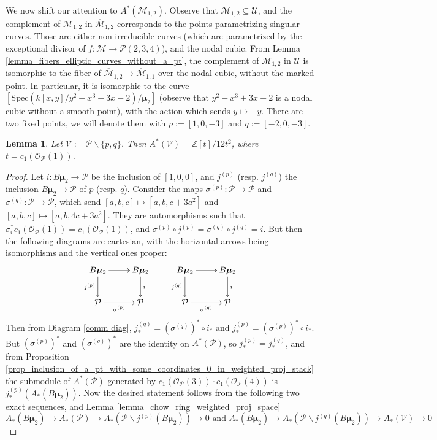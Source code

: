 \documentclass[11pt]{amsart}
\newtheorem{lemma}[theorem]{Lemma}
\theoremstyle{definition}
\theoremstyle{remark}
\newcommand{\calO}{\mathcal O}
\newcommand{\calM}{\mathcal M}
\newcommand{\calU}{\mathcal U}
\newcommand{\calP}{\mathcal P}
\newcommand{\calV}{\mathcal V}
\newcommand{\bmu}{\boldsymbol{\mu}}
\newcommand{\Spec}{\mathrm{Spec}}
\begin{document}
We now shift our attention to $A^*(\calM_{1,2})$. Observe that $\calM_{1,2}\subseteq \calU$, and the complement of $\calM_{1,2}$ in $\overline{\calM}_{1,2}$ corresponds to the points parametrizing singular curves. Those are either non-irreducible curves (which are parametrized by the exceptional divisor of $f:\calM \to \calP(2,3,4)$), and the nodal cubic. From Lemma \ref{lemma_fibers_elliptic_curves_without_a_pt}, the complement of $\calM_{1,2}$ in $\calU$
is isomorphic to the fiber of $\overline{\calM}_{1,2} \to \overline{\calM}_{1,1}$ over the nodal cubic, without the marked point. In particular, it is isomorphic to the curve $[\Spec(k[x,y]/y^2-x^3 + 3x -2)/\bmu_2]$ (observe that $y^2-x^3 + 3x -2$ is a nodal cubic without a smooth point), with the action which sends $y\mapsto -y$. There are two fixed points, we will denote them with $p:=[1,0,-3]$ and $q:=[-2,0,-3]$.
\begin{lemma}\label{lemma_calP_minus_Bmu2_points_on_the_cusp}
Let $\calV:=\calP\smallsetminus \{p,q\}$. Then $A^*(\calV) = \mathbb{Z}[t]/12t^2$, where $t= c_1(\calO_\calP(1))$.
\end{lemma}
\begin{proof}Let $i:B\bmu_2 \to \calP$ be the inclusion of $[1,0,0]$, and $j^{(p)}$ (resp. $j^{(q)}$) the inclusion $B\bmu_2 \to \calP$ of $p$ (resp. $q$). 
Consider the maps $\sigma^{(p)}:\calP \to \calP$ and $\sigma^{(q)}:\calP \to \calP$, which send $[a,b,c]\mapsto [a,b,c+3a^2]$ and $[a,b,c]\mapsto [a,b,4c+3a^2]$. They are automorphisms such that $\sigma_i^*c_1(\calO_\calP(1)) = c_1(\calO_\calP(1))$, and $\sigma^{(p)}\circ j^{(p)} =\sigma^{(q)}\circ j^{(q)} =  i$. But then the following diagrams are cartesian, with the horizontal arrows being isomorphisms and the vertical ones proper:
$$\xymatrix{B\bmu_2 \ar[d]_-{j^{(p)}} \ar[r] & B\bmu_2 \ar[d]^i \\ \calP\ar[r]_-{\sigma^{(p)}} & \calP} \text{  }\text{  }\text{  }\text{  }\text{  }\text{  }\xymatrix{B\bmu_2 \ar[d]_-{j^{(q)}} \ar[r] & B\bmu_2 \ar[d]^i \\ \calP\ar[r]_-{\sigma^{(q)}} & \calP}$$
Then from Diagram \ref{comm diag}, $j^{(q)}_* = (\sigma^{(q)})^*\circ i_*$ and $j^{(p)}_* = (\sigma^{(p)})^*\circ i_*$. But $(\sigma^{(p)})^*$ and $(\sigma^{(q)})^*$ are the identity on $A^*(\calP)$, so $j^{(p)}_* = j^{(q)}_*$,
and from Proposition \ref{prop_inclusion_of_a_pt_with_some_coordinates_0_in_weighted_proj_stack} the submodule of $A^*(\calP)$ generated by $c_1(\calO_{\calP}(3))\cdot c_1(\calO_{\calP}(4))$ is $j^{(p)}_*(A_*(B\bmu_2))$. Now the desired statement follows from the following two exact sequences, and Lemma \ref{lemma_chow_ring_weighted_proj_space}
$$A_*(B\bmu_2) \to A_*(\calP) \to A_*(\calP\smallsetminus j^{(p)}(B\bmu_2)) \to 0 \text{ and }A_*(B\bmu_2) \to A_*(\calP\smallsetminus j^{(q)}(B\bmu_2)) \to A_*(\calV) \to 0$$
\end{proof}
\end{document}

